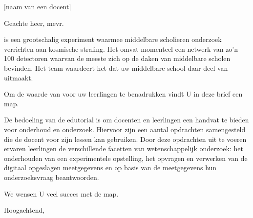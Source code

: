 

\signature{Het \hisparc team}
\address{Science Park 105\\
         1098 XG \\
         Amsterdam}



\begin{letter}{[naam van een docent] \\ [middelbare school staan]}

\opening{Geachte heer, mevr.} %

\hisparc is een grootschalig experiment waarmee middelbare scholieren
onderzoek verrichten aan kosmische straling. Het omvat momenteel een
netwerk van zo'n 100 detectoren waarvan de meeste zich op de daken van
middelbare scholen bevinden. Het \hisparc team waardeert het dat uw
middelbare school daar deel van uitmaakt.  

Om de waarde van \hisparc voor uw leerlingen te benadrukken vindt U in
deze brief een \hisparc map.

De bedoeling van de edutorial is om docenten en leerlingen een handvat
te bieden voor onderhoud en onderzoek. Hiervoor zijn een aantal
opdrachten samengesteld die de docent voor zijn lessen kan gebruiken.
Door deze opdrachten uit te voeren ervaren leerlingen de verschillende
facetten van wetenschappelijk onderzoek: het onderhouden van een
experimentele opstelling, het opvragen en verwerken van de digitaal
opgeslagen meetgegevens en op basis van de meetgegevens hun
onderzoeksvraag beantwoorden. 

We wensen U veel succes met de \hisparc map.
 
\closing{Hoogachtend,}

 
\end{letter}


